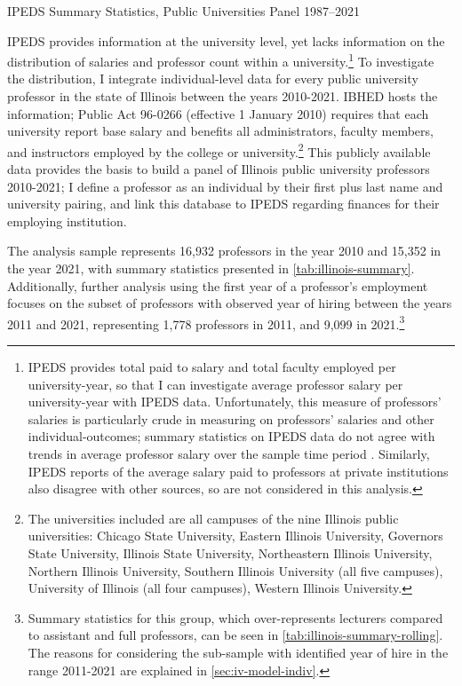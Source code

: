 \documentclass[notitlepage,12pt]{article}
\begin{document}
\begin{table}[h!]
    \singlespacing
    \centering
    \caption{IPEDS Summary Statistics, Public Universities Panel 1987--2021}
    \makebox[\textwidth][c]{}
    \label{tab:ipeds-summary}
\end{table}

IPEDS provides information at the university level, yet lacks information on the distribution of salaries and professor count within a university.\footnote{
    IPEDS provides total paid to salary and total faculty employed per university-year, so that I can investigate average professor salary per university-year with IPEDS data.
    Unfortunately, this measure of professors' salaries is particularly crude in measuring on professors' salaries and other individual-outcomes; summary statistics on IPEDS data do not agree with trends in average professor salary over the sample time period \citep{aau2021survey}.
    Similarly, IPEDS reports of the average salary paid to professors at private institutions also disagree with other sources, so are not considered in this analysis.
}
To investigate the distribution, I integrate individual-level data for every public university professor in the state of Illinois between the years 2010-2021.
IBHED hosts the information;
Public Act 96-0266 (effective 1 January 2010) requires that each university report base salary and benefits all administrators, faculty members, and instructors employed by the college or university.\footnote{
    The universities included are all campuses of the nine Illinois public universities: Chicago State University, Eastern Illinois University, Governors State University, Illinois State University, Northeastern Illinois University, Northern Illinois University, Southern Illinois University  (all five campuses), University of Illinois (all four campuses), Western Illinois University.
}
This publicly available data provides the basis to build a panel of Illinois public university professors 2010-2021; I define a professor as an individual by their first plus last name and university pairing, and link this database to IPEDS regarding finances for their employing institution.

The analysis sample represents 16,932 professors in the year 2010 and 15,352 in the year 2021, with summary statistics presented in \autoref{tab:illinois-summary}.
Additionally, further analysis using the first year of a professor's employment focuses on the subset of professors with observed year of hiring between the years 2011 and 2021, representing 1,778 professors in 2011, and 9,099 in 2021.\footnote{
    Summary statistics for this group, which over-represents lecturers compared to assistant and full professors, can be seen in \autoref{tab:illinois-summary-rolling}.
    The reasons for considering the sub-sample with identified year of hire in the range 2011-2021 are explained in \autoref{sec:iv-model-indiv}.
}
\end{document}
